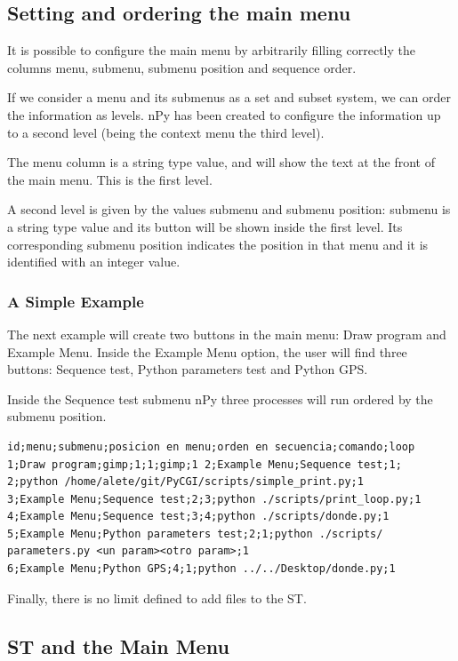 \documentclass[a4paper,10pt]{article}
\begin{document}
\subsection{Setting and ordering the main menu}

It is possible to configure the main menu by arbitrarily filling correctly the columns menu, submenu, submenu position and sequence order.

If we consider a menu and its submenus as a set and subset system, we can order the information as levels. nPy has been created to configure the information up to a second level (being the context menu the third level).

The menu column is a string type value, and will show the text at the front of the main menu. This is the first level.

A second level is given by the values submenu and submenu position: submenu is a string type value and its button will be shown inside the first level. Its corresponding submenu position indicates the position in that menu and it is identified with an integer value.

\subsubsection{A Simple Example}

The next example will create two buttons in the main menu: Draw program and Example Menu. Inside the Example Menu option, the user will find three buttons: Sequence test, Python parameters test and Python GPS.

Inside the Sequence test submenu nPy three processes will run ordered by the submenu position.

\begin{verbatim}
id;menu;submenu;posicion en menu;orden en secuencia;comando;loop 
1;Draw program;gimp;1;1;gimp;1 2;Example Menu;Sequence test;1;
2;python /home/alete/git/PyCGI/scripts/simple_print.py;1 
3;Example Menu;Sequence test;2;3;python ./scripts/print_loop.py;1 
4;Example Menu;Sequence test;3;4;python ./scripts/donde.py;1 
5;Example Menu;Python parameters test;2;1;python ./scripts/
parameters.py <un param><otro param>;1 
6;Example Menu;Python GPS;4;1;python ../../Desktop/donde.py;1
\end{verbatim}

\noindent Finally, there is no limit defined to add files to the ST.

\subsection{ST and the Main Menu}
\end{document}
